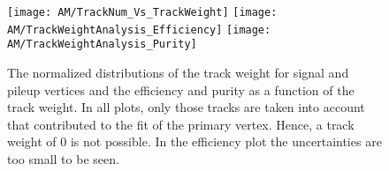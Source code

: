 \begin{figure}[!ht]
    \centering
    \texttt{[image: AM/TrackNum\_Vs\_TrackWeight]}
    \texttt{[image: AM/TrackWeightAnalysis\_Efficiency]}
    \texttt{[image: AM/TrackWeightAnalysis\_Purity]}
    \caption[Distribution of the track weight and efficiency and purity \vs{} track weight]{The normalized distributions of the track weight for signal and pileup vertices and the efficiency and purity as a function of the track weight. In all plots, only those tracks are taken into account that contributed to the fit of the primary vertex. Hence, a track weight of 0 is not possible. In the efficiency plot the uncertainties are too small to be seen.  \label{plot:AMTWdistpureff}}
\end{figure}

